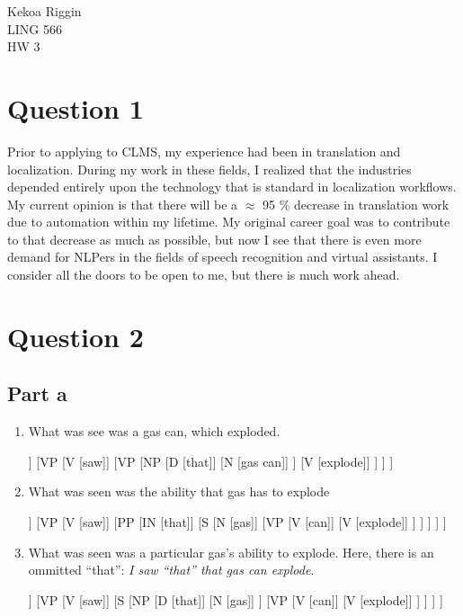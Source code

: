 \documentclass[10pt]{article}
\begin{document}
\noindent
Kekoa Riggin\\
LING 566\\
HW 3

\section*{Question 1}
\noindent
Prior to applying to CLMS, my experience had been in translation and localization. During my work in these fields, I realized that the industries depended entirely upon the technology that is standard in localization workflows. My current opinion is that there will be a $\approx$ 95 \% decrease in translation work due to automation within my lifetime. My original career goal was to contribute to that decrease as much as possible, but now I see that there is even more demand for NLPers in the fields of speech recognition and virtual assistants. I consider all the doors to be open to me, but there is much work ahead. 

\section*{Question 2}

\subsection*{Part a}
\noindent
\begin{enumerate}
\item
What was see was a gas can, which exploded.

\begin{forest}
	[S
		[N [I]]
		[VP 
			[V [saw]]
			[VP
				[NP
					[D [that]]
					[N [gas can]]
				]
				[V [explode]]
			]
		]
	]
\end{forest}

\item 
What was seen was the ability that gas has to explode

\begin{forest}
	[S
		[N [I]]
		[VP 
			[V [saw]]
			[PP
				[IN [that]]
				[S
					[N [gas]]
					[VP 
						[V [can]]
						[V [explode]]
					]
				]
			]
		]
	]
\end{forest}

\item
What was seen was a particular gas's ability to explode. Here, there is an ommitted ``that'': \textit{I saw ``that'' that gas can explode}.

\begin{forest}
	[S
		[N [I]]
		[VP 
			[V [saw]]
			[S
				[NP
					[D [that]]
					[N [gas]]
				]					
				[VP
					[V [can]]
					[V [explode]]
				]
			]
		]
	]
\end{forest}

\end{enumerate}
\end{document}
